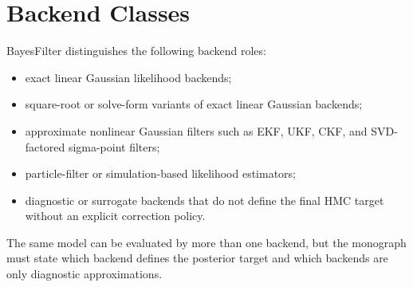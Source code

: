 \section{Backend Classes}
\label{sec:bf-backend-classes}

BayesFilter distinguishes the following backend roles:
\begin{itemize}
  \item exact linear Gaussian likelihood backends;
  \item square-root or solve-form variants of exact linear Gaussian backends;
  \item approximate nonlinear Gaussian filters such as EKF, UKF, CKF, and
    SVD-factored sigma-point filters;
  \item particle-filter or simulation-based likelihood estimators;
  \item diagnostic or surrogate backends that do not define the final HMC
    target without an explicit correction policy.
\end{itemize}
The same model can be evaluated by more than one backend, but the monograph
must state which backend defines the posterior target and which backends are
only diagnostic approximations.
